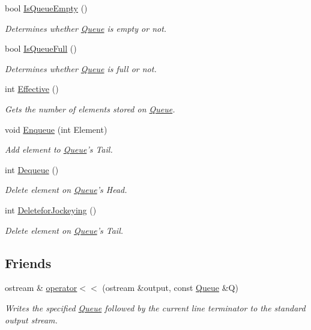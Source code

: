 \begin{DoxyCompactItemize}
bool \hyperlink{class_queue_abb997d38f5ac3bb506d8d073289affc1}{Is\-Queue\-Empty} ()
\begin{DoxyCompactList}\small\item\em Determines whether \hyperlink{class_queue}{Queue} is empty or not. \end{DoxyCompactList}\item 
bool \hyperlink{class_queue_a2815639bf7c03ea9ccda9fa30c20f52e}{Is\-Queue\-Full} ()
\begin{DoxyCompactList}\small\item\em Determines whether \hyperlink{class_queue}{Queue} is full or not. \end{DoxyCompactList}\item 
int \hyperlink{class_queue_ab9e0ba7176e94e7ee0ef75f0ef6120b0}{Effective} ()
\begin{DoxyCompactList}\small\item\em Gets the number of elements stored on \hyperlink{class_queue}{Queue}. \end{DoxyCompactList}\item 
void \hyperlink{class_queue_afe902699750ee1aa4600af72c4616957}{Enqueue} (int Element)
\begin{DoxyCompactList}\small\item\em Add element to \hyperlink{class_queue}{Queue}'s Tail. \end{DoxyCompactList}\item 
int \hyperlink{class_queue_a298b3523c3f2ddda8dcc29c1aa499b26}{Dequeue} ()
\begin{DoxyCompactList}\small\item\em Delete element on \hyperlink{class_queue}{Queue}'s Head. \end{DoxyCompactList}\item 
int \hyperlink{class_queue_abee14281bbb50742493403315009822e}{Deletefor\-Jockeying} ()
\begin{DoxyCompactList}\small\item\em Delete element on \hyperlink{class_queue}{Queue}'s Tail. \end{DoxyCompactList}\end{DoxyCompactItemize}
\subsection*{Friends}
\begin{DoxyCompactItemize}
\item 
ostream \& \hyperlink{class_queue_aadecbaa986b78ce2a846e652d7bb57af}{operator$<$$<$} (ostream \&output, const \hyperlink{class_queue}{Queue} \&Q)
\begin{DoxyCompactList}\small\item\em Writes the specified \hyperlink{class_queue}{Queue} followed by the current line terminator to the standard output stream. \end{DoxyCompactList}\end{DoxyCompactItemize}


